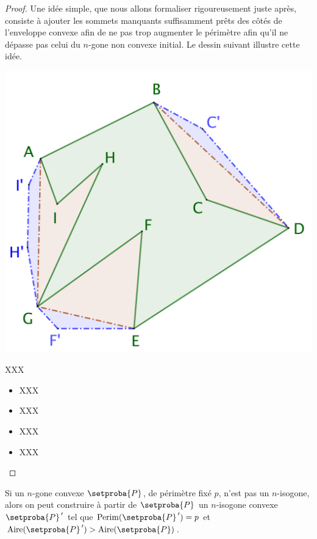 \begin{proof}
	Une idée simple, que nous allons formaliser rigoureusement juste après, consiste à ajouter les sommets manquants suffisamment prêts des côtés de l'enveloppe convexe afin de ne pas trop augmenter le périmètre afin qu'il ne dépasse pas celui du $n$-gone non convexe initial. Le dessin suivant illustre cette idée.	
	
	\begin{center}
		\includegraphics[scale=.4]{content/polygon/polygon-convex-hull-distortion.png}
	\end{center}

	XXX
	\begin{itemize}
		\item XXX

		\item XXX

		\item XXX

		\item XXX
	\end{itemize}
\end{proof}




\begin{fact}\label{iso-poly}
	Si un $n$-gone convexe $\setproba{P}$, de périmètre fixé $p$, n'est pas un $n$-isogone, alors on peut construire à partir de $\setproba{P}$ un $n$-isogone convexe $\setproba{P}^{\,\prime}$ tel que $\perim{\setproba{P}^{\,\prime}} = p$ et $\area{\setproba{P}^{\,\prime}} > \area{\setproba{P}}$.
\end{fact}


